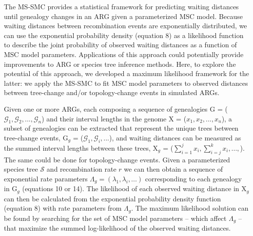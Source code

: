 \documentclass[11pt]{article}
\begin{document}
The MS-SMC provides a statistical framework for predicting waiting distances 
until genealogy changes in an ARG given a parameterized MSC model. 
Because waiting distances between recombination events are exponentially 
distributed, we can use the exponential probability density (equation 8) 
as a likelihood function to describe the joint probability of observed
waiting distances as a function of MSC model parameters. 
Applications of this approach could potentially provide improvements to ARG 
or species tree inference methods. 
Here, to explore the potential of this approach, we developed a maximum 
likelihood framework for the latter: we apply the MS-SMC to fit MSC 
model parameters to observed distances between tree-change and/or
topology-change events in simulated ARGs. 


% 
% 

Given one or more ARGs, each composing a sequence of genealogies 
G = ($\mathcal{G}_1, \mathcal{G}_2, ..., \mathcal{G}_n$) and 
their interval lengths in the genome X = ($x_1, x_2, ..., x_n$),
a subset of genealogies can be extracted that represent the unique 
trees between tree-change events, 
G$_g$ = ($\mathcal{G}_1, \mathcal{G}_i, ...$), and 
waiting distances can be measured as the summed interval lengths between 
these trees, 
X$_g$ = ($\sum_{i=1}^j x_i, \sum_{i=j}^{k} x_i, ..., $).
The same could be done for topology-change events. 
Given a parameterized species tree $\mathcal{S}$ and recombination 
rate $r$ we can then obtain a sequence of exponential rate parameters
$\Lambda_g = (\lambda_1, \lambda_i, ...)$ corresponding to each genealogy
in G$_g$ (equations 10 or 14). 
The likelihood of each observed waiting distance in X$_g$
can then be calculated from the exponential probability density 
function (equation 8) with rate parameters from $\Lambda_g$. 
The maximum likelihood solution can be found by searching for the
set of MSC model parameters -- which affect $\Lambda_g$ -- 
that maximize the summed log-likelihood of the observed waiting distances.
\end{document}
